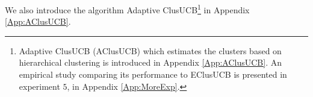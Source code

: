 	We also introduce the algorithm Adaptive ClusUCB\footnote{Adaptive ClusUCB (AClusUCB) which estimates the clusters based on hierarchical clustering is introduced in Appendix \ref{App:AClusUCB}. An empirical study comparing its performance to EClusUCB is presented in experiment $5$, in Appendix \ref{App:MoreExp}.} in Appendix \ref{App:AClusUCB}.


